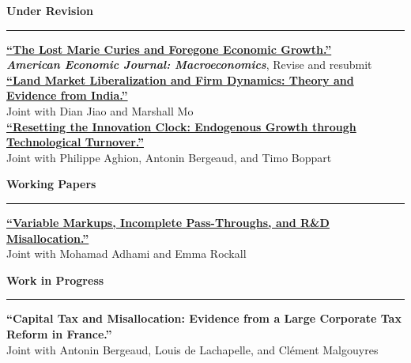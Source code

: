 \documentclass[12pt]{article}
\begin{document}
\vspace{0.5cm}

{\large \textbf{Under Revision}} \\
\noindent\rule[0.5\baselineskip]{\textwidth}{1pt}

\begin{small}
\href{https://jfbrou.github.io/papers/hopper.pdf}{\textbf{``The Lost Marie Curies and Foregone Economic Growth.''}} \\
\textit{\textbf{American Economic Journal: Macroeconomics}}, Revise and resubmit \\[-0.5\baselineskip]

\href{https://drive.google.com/file/d/1z8lTR8R5P9uCwSs1FLgQa9mQ6WbSRwEo/view}{\textbf{``Land Market Liberalization and Firm Dynamics: Theory and Evidence from India.''}} \\
Joint with Dian Jiao and Marshall Mo \\[-0.5\baselineskip]

\href{https://jfbrou.github.io/papers/ABBB_2025.pdf}{\textbf{``Resetting the Innovation Clock: Endogenous Growth through Technological Turnover.''}} \\
Joint with Philippe Aghion, Antonin Bergeaud, and Timo Boppart
\end{small}

\vspace{0.5cm}

{\large \textbf{Working Papers}} \\
\noindent\rule[0.5\baselineskip]{\textwidth}{1pt}

\begin{small}
\href{https://jfbrou.github.io/papers/markups.pdf}{\textbf{``Variable Markups, Incomplete Pass-Throughs, and R\&D Misallocation.''}} \\
Joint with Mohamad Adhami and Emma Rockall
\end{small}

\clearpage

{\large \textbf{Work in Progress}} \\
\noindent\rule[0.5\baselineskip]{\textwidth}{1pt}

\begin{small}
\textbf{``Capital Tax and Misallocation: Evidence from a Large Corporate Tax Reform in France.''} \\
Joint with Antonin Bergeaud, Louis de Lachapelle, and Clément Malgouyres
\end{small}

\vspace{0.5cm}
\end{document}
